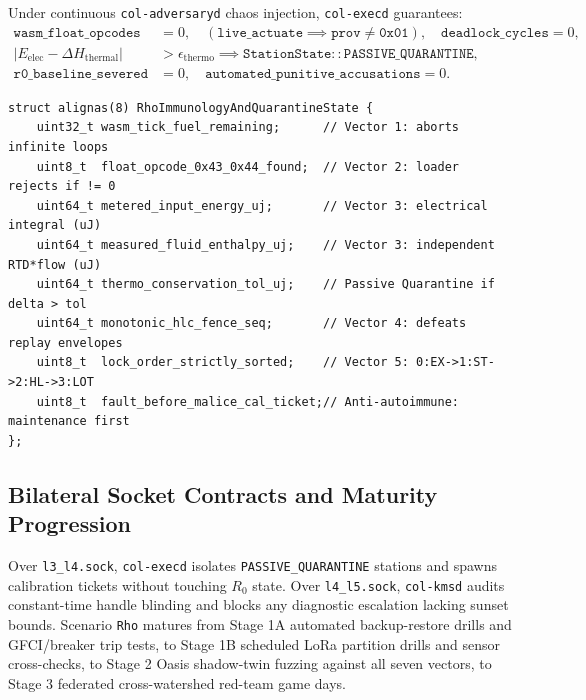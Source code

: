 \begin{invariant}
\label{inv:rho-immunity}
Under continuous \texttt{col-adversaryd} chaos injection, \texttt{col-execd} guarantees:
\begin{align}
\mathtt{wasm\_float\_opcodes} &= 0, \quad (\mathtt{live\_actuate} \implies \mathtt{prov} \neq \mathtt{0x01}), \quad \mathtt{deadlock\_cycles} = 0, \\
|E_{\mathrm{elec}} - \Delta H_{\mathrm{thermal}}| &> \epsilon_{\mathrm{thermo}} \implies \mathtt{StationState::PASSIVE\_QUARANTINE}, \\
\mathtt{r0\_baseline\_severed} &= 0, \quad \mathtt{automated\_punitive\_accusations} = 0.
\end{align}
\end{invariant}

\begin{lstlisting}[caption={Scenario \texttt{Rho} Seven-Vector Chaos Verifier and First-Law Passive Quarantine Frame},label={lst:rho-structs}]
struct alignas(8) RhoImmunologyAndQuarantineState {
    uint32_t wasm_tick_fuel_remaining;      // Vector 1: aborts infinite loops
    uint8_t  float_opcode_0x43_0x44_found;  // Vector 2: loader rejects if != 0
    uint64_t metered_input_energy_uj;       // Vector 3: electrical integral (uJ)
    uint64_t measured_fluid_enthalpy_uj;    // Vector 3: independent RTD*flow (uJ)
    uint64_t thermo_conservation_tol_uj;    // Passive Quarantine if delta > tol
    uint64_t monotonic_hlc_fence_seq;       // Vector 4: defeats replay envelopes
    uint8_t  lock_order_strictly_sorted;    // Vector 5: 0:EX->1:ST->2:HL->3:LOT
    uint8_t  fault_before_malice_cal_ticket;// Anti-autoimmune: maintenance first
};
\end{lstlisting}

\subsection{Bilateral Socket Contracts and Maturity Progression}

Over \texttt{l3\_l4.sock}, \texttt{col-execd} isolates \texttt{PASSIVE\_QUARANTINE} stations and spawns calibration tickets without touching $R_0$
state. Over \texttt{l4\_l5.sock}, \texttt{col-kmsd} audits constant-time handle blinding and blocks any diagnostic escalation lacking sunset bounds.
Scenario \texttt{Rho} matures from Stage 1A automated backup-restore drills and GFCI/breaker trip tests, to Stage 1B scheduled LoRa partition drills and
sensor cross-checks, to Stage 2 Oasis shadow-twin fuzzing against all seven vectors, to Stage 3 federated cross-watershed red-team game days.

